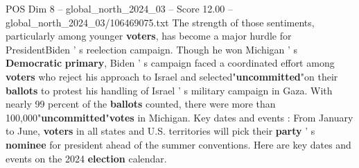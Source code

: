\begin{textsample}{POS Dim 8 – global\_north\_2024\_03 – Score 12.00 – global\_north\_2024\_03/106469075.txt}
The strength of those sentiments, particularly among younger \textbf{voters}, has become a major hurdle for PresidentBiden ' s reelection campaign.
Though he won Michigan ' s \textbf{Democratic} \textbf{primary}, Biden ' s campaign faced a coordinated effort among \textbf{voters} who reject his approach to Israel and selected"\textbf{uncommitted}"on their \textbf{ballots} to protest his handling of Israel ' s military campaign in Gaza.
With nearly 99 percent of the \textbf{ballots} counted, there were more than 100,000"\textbf{uncommitted}"\textbf{votes} in Michigan.
Key dates and events : From January to June, \textbf{voters} in all states and U.S. territories will pick their \textbf{party} ' s \textbf{nominee} for president ahead of the summer conventions.
Here are key dates and events on the 2024 \textbf{election} calendar.

\end{textsample}

